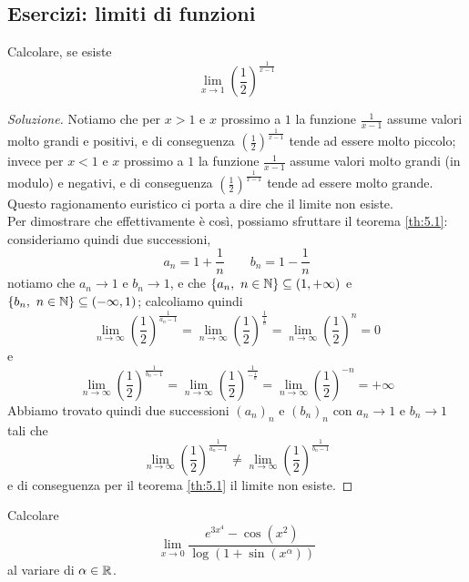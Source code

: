 \subsection{Esercizi: limiti di funzioni}
\begin{exercise}
    \label{ex:5.1}
    Calcolare, se esiste
    \[
    \lim_{x\to 1} \left(\frac{1}{2}\right)^{\frac{1}{x-1}}
    \]
\end{exercise}
\begin{proof}[Soluzione]
    Notiamo che per $x>1$ e $x$ prossimo a $1$ la funzione $\frac{1}{x-1}$ assume valori molto grandi e positivi, e di conseguenza $\left(\frac{1}{2}\right)^{\frac{1}{x-1}}$ tende ad essere molto piccolo; invece per $x<1$ e $x$ prossimo a $1$ la funzione $\frac{1}{x-1}$ assume valori molto grandi (in modulo) e negativi, e di conseguenza $\left(\frac{1}{2}\right)^{\frac{1}{x-1}}$ tende ad essere molto grande. Questo ragionamento euristico ci porta a dire che il limite non esiste. \\
    Per dimostrare che effettivamente è così, possiamo sfruttare il teorema \ref{th:5.1}: consideriamo quindi due successioni,
    \[
    a_n = 1+\frac{1}{n} \qquad b_n = 1-\frac{1}{n}
    \]
    notiamo che $a_n \to 1$ e $b_n \to 1$, e che $\{a_n, \ n\in\amsbb{N}\}\subseteq (1,+\infty)$ e $\{b_n, \ n\in\amsbb{N}\}\subseteq (-\infty, 1)$; calcoliamo quindi
    \[
    \lim_{n\to\infty} \left(\frac{1}{2}\right)^{\frac{1}{a_n-1}} = \lim_{n\to\infty} \left(\frac{1}{2}\right)^{\frac{1}{\frac{1}{n}}} = \lim_{n\to\infty}\left(\frac{1}{2}\right)^n = 0
    \]
    e 
    \[
    \lim_{n\to\infty} \left(\frac{1}{2}\right)^{\frac{1}{b_n-1}} = \lim_{n\to\infty} \left(\frac{1}{2}\right)^{\frac{1}{-\frac{1}{n}}} = \lim_{n\to\infty}\left(\frac{1}{2}\right)^{-n} = +\infty
    \]
    Abbiamo trovato quindi due successioni $(a_n)_n$ e $(b_n)_n$ con $a_n\to 1$ e $b_n\to 1$ tali che
    \[
    \lim_{n\to\infty}\left(\frac{1}{2}\right)^{\frac{1}{a_n-1}} \ne 
    \lim_{n\to\infty}\left(\frac{1}{2}\right)^{\frac{1}{b_n-1}}
    \]
    e di conseguenza per il teorema \ref{th:5.1} il limite non esiste.
\end{proof}
\begin{exercise}
    \label{ex:5.2}
    Calcolare
    \[
    \lim_{x\to 0}\frac{e^{3x^4}-\cos(x^2)}{\log(1+\sin(x^\alpha))}
    \]
    al variare di $\alpha\in\amsbb{R}$.
\end{exercise}
